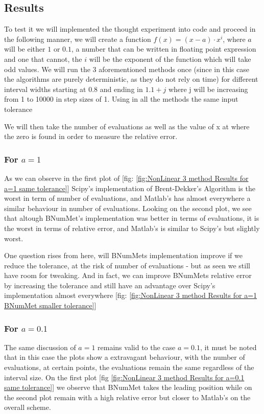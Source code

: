 \subsection{Results}
To test it we will implemented the thought experiment into code and proceed in the following manner, we will create a function $f(x) = (x-a)\cdot x^{i}$, where $a$ will be either $1$ or $0.1$, a number that can be written in floating point expression and one that cannot, the $i$ will be the exponent of the function which will take odd values. We will run the 3 aforementioned methods once (since in this case the algorithms are purely deterministic, as they do not rely on time) for different interval widths starting at $0.8$ and ending in $1.1+j$ where j will be increasing from 1 to 10000 in step sizes of 1. Using in all the methods the same input tolerance

We will then take the number of evaluations as well as the value of x at where the zero is found in order to measure the relative error.

\subsubsection{For $a=1$}
As we can observe in the first plot of [fig: \ref{fig:NonLinear 3 method Results for a=1 same tolerance}] Scipy's implementation of Brent-Dekker's Algorithm is the worst in term of number of evaluations, and Matlab's has almost everywhere a similar behaviour in number of evaluations. Looking on the second plot, we see that altough BNumMet's implementation was better in terms of evaluations, it is the worst in terms of relative error, and Matlab's is similar to Scipy's but slightly worst.

One question rises from here, will BNumMets implementation improve if we reduce the tolerance, at the risk of number of evaluations - but as seen we still have room for tweaking. And in fact, we can improve BNumMets relative error by increasing the tolerance and still have an advantage over Scipy's implementation almost everywhere [fig: \ref{fig:NonLinear 3 method Results for a=1 BNumMet smaller tolerance}]

\subsubsection{For $a=0.1$}
The same discussion of $a=1$ remains valid to the case $a=0.1$, it must be noted that in this case the plots show a extravagant behaviour, with the number of evaluations, at certain points, the evaluations remain the same regardless of the interval size. On the first plot [fig \ref{fig:NonLinear 3 method Results for a=0.1 same tolerance}] we observe that BNumMet takes the leading position while on the second plot remain with a high relative error but closer to Matlab's on the overall scheme.

